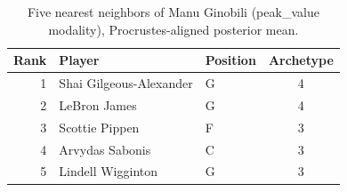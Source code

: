\begin{table}[htbp]
  \centering\small
  \begin{tabular}{rllc}
    \toprule
    Rank & Player & Position & Archetype \\
    \midrule
    1 & Shai Gilgeous-Alexander & G & 4 \\
    2 & LeBron James & G & 4 \\
    3 & Scottie Pippen & F & 3 \\
    4 & Arvydas Sabonis & C & 3 \\
    5 & Lindell Wigginton & G & 3 \\
    \bottomrule
  \end{tabular}
  \caption{Five nearest neighbors of Manu Ginobili (peak_value modality), Procrustes-aligned posterior mean.}
  \label{tab:Manu_Ginobili_neighbors_peak_value}
\end{table}

